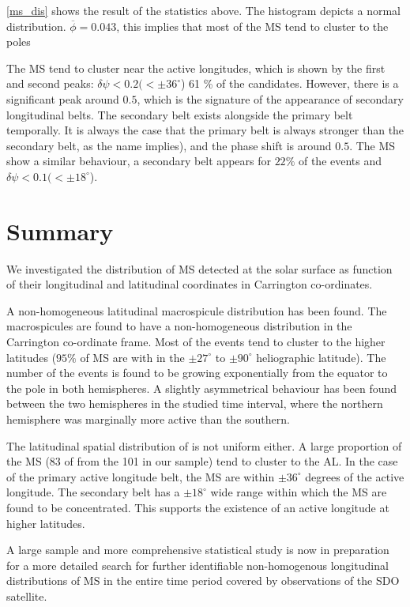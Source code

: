 \cref{ms_dis} shows the result of the statistics above. 
The histogram depicts a normal distribution. 
$\overline{\phi}=0.043$, this implies that most of the MS tend to cluster to the poles

The MS tend to cluster near the active longitudes, which is shown by the first and second peaks: $\delta\psi< 0.2 (<\pm 36^{\circ}$) 61 \% of the candidates.
However, there is a significant peak around $0.5$, which is the signature of the appearance of secondary longitudinal belts. 
The secondary belt exists alongside the primary belt temporally. 
It is always the case that the primary belt is always stronger than the secondary belt, as the name implies), and the phase shift is around $0.5$.
The MS show a similar behaviour, a secondary belt appears for $22\%$ of the events and $\delta\psi< 0.1 (<\pm 18^{\circ}$).

\section{Summary}
We investigated the distribution of MS detected at the solar surface as function of their longitudinal and latitudinal coordinates in Carrington co-ordinates.

A non-homogeneous latitudinal macrospicule distribution has been found. 
The macrospicules are found to have a non-homogeneous distribution in the Carrington co-ordinate frame.  
Most of the events tend to cluster to the higher latitudes ($95\%$ of MS are with in the $\pm27^{\circ}$ to $\pm90^{\circ}$ heliographic latitude).
The number of the events is found to be growing exponentially from the equator to the pole in both hemispheres. 
A slightly asymmetrical behaviour has been found between the two hemispheres in the studied time interval, where the northern hemisphere was marginally more active than the southern. 

The latitudinal spatial distribution of is not uniform either. A large proportion of the MS (83 of from the 101 in our sample) tend to cluster to the AL.
In the case of the primary active longitude belt, the MS are within $\pm 36^{\circ}$ degrees of the active longitude.
The secondary belt has a $\pm 18^{\circ}$ wide range within which the MS are found to be concentrated.
This supports the existence of an active longitude at higher latitudes.

A large sample and more comprehensive statistical study is now in preparation for a more detailed search for further identifiable non-homogenous longitudinal distributions of MS in the entire time period covered by observations of the SDO satellite.
